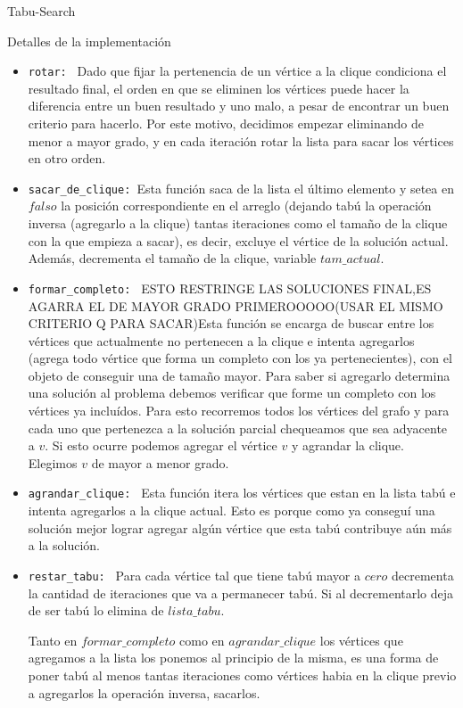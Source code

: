 \begin{section}{Tabu-Search}
\begin{subsection}{Detalles de la implementación}
		\begin{itemize}			
			\item \texttt{rotar: } Dado que fijar la pertenencia de un vértice a la clique condiciona el resultado final, el orden en que se eliminen los vértices puede hacer la diferencia entre un buen resultado y uno malo, a pesar de encontrar un buen criterio para hacerlo. Por este motivo, decidimos empezar eliminando de menor a mayor grado, y en cada iteración rotar la lista para sacar los vértices en otro orden.
			
			\item \texttt{sacar\_de\_clique: }Esta función saca de la lista el último elemento y setea en $falso$ la posición correspondiente en el arreglo (dejando tabú la operación inversa (agregarlo a la clique) tantas iteraciones como el tamaño de la clique con la que empieza a sacar), es decir, excluye el vértice de la solución actual. Además, decrementa el tamaño de la clique, variable $tam\_actual$.
			
			\item \texttt{formar\_completo: } ESTO RESTRINGE LAS SOLUCIONES FINAL,ES AGARRA EL DE MAYOR GRADO PRIMEROOOOO(USAR EL MISMO CRITERIO Q PARA SACAR)Esta función se encarga de buscar entre los vértices que actualmente no pertenecen a la clique e intenta agregarlos (agrega todo vértice que forma un completo con los ya pertenecientes), con el objeto de conseguir una de tamaño mayor. Para saber si agregarlo determina una solución al problema debemos verificar que forme un completo con los vértices ya incluídos. Para esto recorremos todos los vértices del grafo y para cada uno que pertenezca a la solución parcial chequeamos que sea adyacente a $v$. Si esto ocurre podemos agregar el vértice $v$ y agrandar la clique. Elegimos $v$ de mayor a menor grado.

			\item \texttt{agrandar\_clique: } Esta función itera los vértices que estan en la lista tabú e intenta agregarlos a la clique actual. Esto es porque como ya conseguí una solución mejor lograr agregar algún vértice que esta tabú contribuye aún más a la solución.

			\item \texttt{restar\_tabu: } Para cada vértice tal que tiene tabú mayor a $cero$ decrementa la cantidad de iteraciones que va a permanecer tabú. Si al decrementarlo deja de ser tabú lo elimina de $lista\_tabu$.

			Tanto en $formar\_completo$ como en $agrandar\_clique$ los vértices que agregamos a la lista los ponemos al principio de la misma, es una forma de poner tabú al menos tantas iteraciones como vértices habia en la clique previo a agregarlos la operación inversa, sacarlos.
		\end{itemize}
	\end{subsection}


\end{section}
